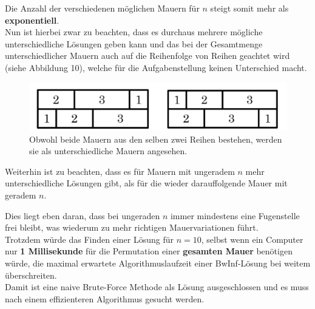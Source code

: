 \documentclass[a4paper,12pt]{article}
\begin{document}
Die Anzahl der verschiedenen möglichen Mauern für $n$ steigt somit mehr als 
\textbf{exponentiell}.
\\[0.4cm]
Nun ist hierbei zwar zu beachten, dass es durchaus mehrere mögliche unterschiedliche Lösungen geben kann und das bei der Gesamtmenge unterschiedlicher Mauern auch auf die Reihenfolge von Reihen geachtet wird (siehe Abbildung 10), welche für die Aufgabenstellung keinen Unterschied macht.
\begin{figure}[H]
    \centering
    \includegraphics[width=0.9\linewidth]{Bilder/Aufgabe1/Mauervarianten_N3.png}
    \caption{Obwohl beide Mauern aus den selben zwei Reihen bestehen, werden sie als unterschiedliche Mauern angesehen.}
\end{figure}
Weiterhin ist zu beachten, dass es für Mauern mit ungeradem $n$ mehr unterschiedliche Lösungen gibt, als für die wieder darauffolgende Mauer mit geradem $n$.

Dies liegt eben daran, dass bei ungeraden $n$ immer mindestens eine Fugenstelle frei bleibt, was wiederum zu mehr richtigen Mauervariationen führt.
\\[0.4cm]
Trotzdem würde das Finden einer Lösung für $n = 10$, selbst wenn ein Computer nur \textbf{1 Millisekunde} für die Permutation einer \textbf{gesamten Mauer} benötigen würde, die maximal erwartete Algorithmuslaufzeit einer BwInf-Lösung bei weitem überschreiten.
\\[0.4cm]
Damit ist eine naive Brute-Force Methode als Lösung ausgeschlossen und es muss nach einem effizienteren Algorithmus gesucht werden.
\end{document}
